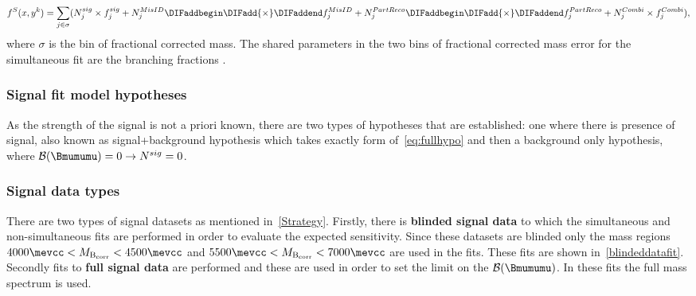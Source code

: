 \begin{equation}
f^{S}(x,y^{k})=\sum_{j\in{\sigma}}(N_{j}^{sig}\times f_{j}^{sig} + N_{j}^{MisID} \DIFaddbegin \DIFadd{\times }\DIFaddend f_{j}^{MisID} + N_{j}^{PartReco} \DIFaddbegin \DIFadd{\times }\DIFaddend f_{j}^{PartReco} + N_{j}^{Combi} \times f_{j}^{Combi}),
\label{eq:fullhypo2}
\end{equation}
where $\sigma$ is the bin of fractional corrected mass. The shared parameters in the two bins of fractional corrected mass error for the simultaneous fit are the branching fractions \DIFdelbegin {}\DIFdelend \DIFaddbegin {}\DIFaddend . 

\subsubsection{Signal fit model hypotheses}
As the strength of the signal is not a priori known, there are two types of hypotheses that are established: one where there is \DIFdelbegin {}\DIFdelend \DIFaddbegin {}\DIFaddend presence of signal, also known as \DIFaddbegin {}\DIFaddend signal+background hypothesis \DIFdelbegin {}\DIFdelend which takes exactly \DIFaddbegin {}\DIFaddend form of~\autoref{eq:fullhypo} and then a background only hypothesis, where $\mathcal{B}(\Bmumumu)=0 \rightarrow N^{sig}=0$.

\subsubsection{Signal data types}

There are two types of signal datasets as mentioned in~\autoref{Strategy}. Firstly, there is \DIFaddbegin {}\DIFaddend \textbf{blinded signal data} to which the simultaneous and non-simultaneous fits are performed in order to evaluate the expected sensitivity. Since these datasets are blinded only the mass regions $4000{\mevcc}<M_{\rm{B_{corr}}}<{4500\mevcc}$ and $5500{\mevcc}<M_{\rm{B_{corr}}}<{7000\mevcc}$ are used in the fits. These fits are shown in~\autoref{blindeddatafit}. Secondly fits to \DIFaddbegin {}\DIFaddend \textbf{full signal data} are performed and these are used in order to set the limit on the $\mathcal{B}(\Bmumumu)$. In these fits the full mass spectrum is used.

